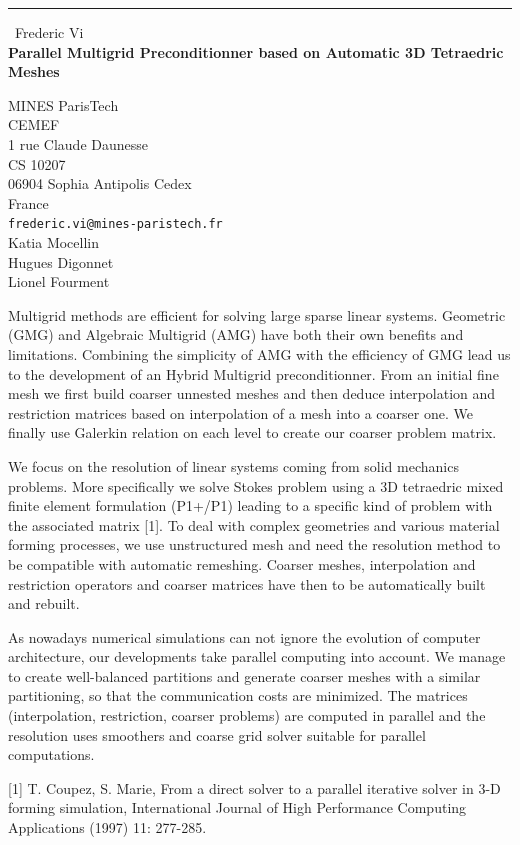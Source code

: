 \documentclass{report}
\begin{document}
\begin{center}
\rule{6in}{1pt} \
{\large Frederic Vi \\
{\bf Parallel Multigrid Preconditionner based on Automatic 3D Tetraedric Meshes}}

MINES ParisTech \\ CEMEF \\ 1 rue Claude Daunesse \\ CS 10207 \\ 06904 Sophia Antipolis Cedex \\ France
\\
{\tt frederic.vi@mines-paristech.fr}\\
Katia Mocellin\\
Hugues Digonnet\\
Lionel Fourment\end{center}

Multigrid methods are efficient for solving large sparse linear systems.
Geometric (GMG) and Algebraic Multigrid (AMG) have both their own
benefits and limitations. Combining the simplicity of AMG with the
efficiency of GMG lead us to the development of an Hybrid Multigrid
preconditionner. From an initial fine mesh we first build coarser
unnested meshes and then deduce interpolation and restriction matrices
based on interpolation of a mesh into a coarser one. We finally use
Galerkin relation on each level to create our coarser problem matrix.

We focus on the resolution of linear systems coming from solid mechanics
problems. More specifically we solve Stokes problem using a 3D tetraedric
mixed finite element formulation (P1+/P1) leading to a specific kind of
problem with the associated matrix [1]. To deal with complex geometries
and various material forming processes, we use unstructured mesh and need
the resolution method to be compatible with automatic remeshing. Coarser
meshes, interpolation and restriction operators and coarser matrices have
then to be automatically built and rebuilt.

As nowadays numerical simulations can not ignore the evolution of
computer architecture, our developments take parallel computing into
account. We manage to create well-balanced partitions and generate
coarser meshes with a similar partitioning, so that the communication
costs are minimized. The matrices (interpolation, restriction, coarser
problems) are computed in parallel and the resolution uses smoothers and
coarse grid solver suitable for parallel computations.


[1] T. Coupez, S. Marie, From a direct solver to a parallel iterative
solver in 3-D forming simulation, International Journal of High
Performance Computing Applications (1997) 11: 277-285.
\end{document}
